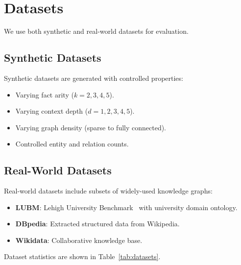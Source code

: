 \section{Datasets}
\label{sec:datasets}

We use both synthetic and real-world datasets for evaluation.

\subsection{Synthetic Datasets}
\label{sec:datasets:synthetic}

Synthetic datasets are generated with controlled properties:
\begin{itemize}
    \item Varying fact arity ($k = 2, 3, 4, 5$).
    \item Varying context depth ($d = 1, 2, 3, 4, 5$).
    \item Varying graph density (sparse to fully connected).
    \item Controlled entity and relation counts.
\end{itemize}

\subsection{Real-World Datasets}
\label{sec:datasets:real}

Real-world datasets include subsets of widely-used knowledge graphs:
\begin{itemize}
    \item \textbf{LUBM}: Lehigh University Benchmark~\cite{lubm2005}
          with university domain ontology.
    \item \textbf{DBpedia}: Extracted structured data from Wikipedia.
    \item \textbf{Wikidata}: Collaborative knowledge base.
\end{itemize}

Dataset statistics are shown in Table~\ref{tab:datasets}.
